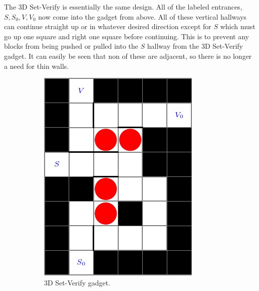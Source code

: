 \documentclass[11pt]{article}
\begin{document}
The 3D Set-Verify is essentially the same design. All of the labeled entrances, $S, S_0, V, V_0$ now come into the gadget from above. All of these vertical hallways can continue straight up or in whatever desired direction except for $S$ which must go up one square and right one square before continuing. This is to prevent any blocks from being pushed or pulled into the $S$ hallway from the 3D Set-Verify gadget. It can easily be seen that non of these are adjacent, so there is no longer a need for thin walls. 
\begin{figure}[!ht]
  \centering
  \caption{Set-Verify Gadgets}
  \begin{subfigure}[b]{0.45\textwidth}
    \includegraphics[width=\textwidth]{set_verify}
    \caption{3D Set-Verify gadget.}
    \label{ldeCoeffs}
  \end{subfigure}
  \hfill
  \begin{subfigure}[b]{0.45\textwidth}

\end{subfigure}
\end{figure}
\end{document}
